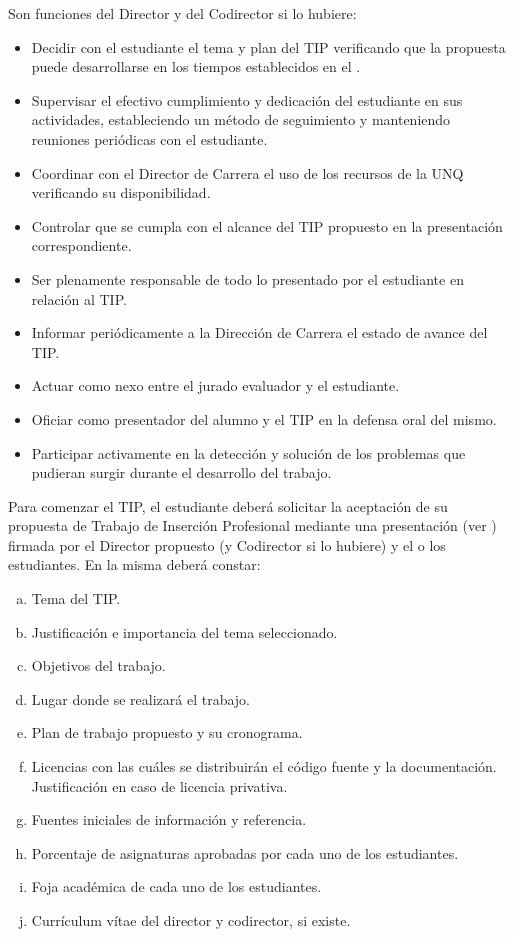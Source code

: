 \articulo Son funciones del Director y del Codirector si lo hubiere:
\begin{itemize}
 \item Decidir con el estudiante el tema y plan del TIP verificando que la
 propuesta puede desarrollarse en los tiempos establecidos en el
 \artHoras.
 \item Supervisar el efectivo cumplimiento y dedicación del estudiante en
 sus actividades, estableciendo un método de seguimiento y
 manteniendo reuniones periódicas con el estudiante.
 \item Coordinar con el Director de Carrera el uso de los recursos de la
 UNQ verificando su disponibilidad.
 \item Controlar que se cumpla con el alcance del TIP propuesto en la
 presentación correspondiente.
 \item Ser plenamente responsable de todo lo presentado por el
 estudiante en relación al TIP.
 \item Informar periódicamente a la Dirección de Carrera el estado de
 avance del TIP.
 \item Actuar como nexo entre el jurado evaluador y el estudiante.
 \item Oficiar como presentador del alumno y el TIP en la defensa oral del
 mismo.
 \item Participar activamente en la detección y solución de los problemas
 que pudieran surgir durante el desarrollo del trabajo.
\end{itemize}



\articulo Para comenzar el TIP, el estudiante deberá solicitar la aceptación
de su propuesta de Trabajo de Inserción Profesional mediante una presentación (ver
\anexoPresentacionPlan) firmada por el Director propuesto (y Codirector si lo
hubiere) y el o los estudiantes. En la misma deberá constar:

\begin{enumerate}[a.]
\item Tema del TIP.
\item Justificación e importancia del tema seleccionado.
\item Objetivos del trabajo.
\item Lugar donde se realizará el trabajo.
\item Plan de trabajo propuesto y su cronograma.
\item Licencias con las cuáles se distribuirán el código fuente y la
documentación.
Justificación en caso de licencia privativa. \nuevo{ }
\item Fuentes iniciales de información y referencia.
\item Porcentaje de asignaturas aprobadas por cada uno de los estudiantes.
\item Foja académica de cada uno de los estudiantes.
\item Currículum vítae del director y codirector, si existe.
\end{enumerate}

